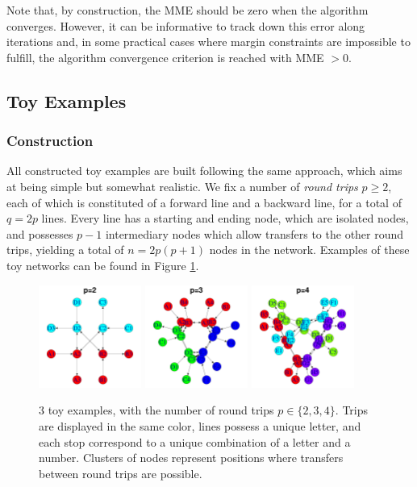 \documentclass{bmcart}
\begin{document}
Note that, by construction, the MME should be zero when the algorithm converges. However, it can be informative to track down this error along iterations and, in some practical cases where margin constraints are impossible to fulfill, the algorithm convergence criterion is reached with MME $> 0$.

\subsection{Toy Examples}
\label{toy_examples}

\subsubsection{Construction}
\label{example_construction}

All constructed toy examples are built following the same approach, which aims at being simple but somewhat realistic. We fix a number of \emph{round trips} $p \geq 2$, each of which is constituted of a forward line and a backward line, for a total of $q = 2p$ lines. Every line has a starting and ending node, which are isolated nodes, and possesses $p-1$ intermediary nodes which allow transfers to the other round trips, yielding a total of $n = 2p(p + 1)$ nodes in the network. Examples of these toy networks can be found in Figure \ref{toy_example_plots}.

\begin{figure}[h]
	\includegraphics[width=0.3\textwidth]{fig/toy_2_display.pdf}
	\includegraphics[width=0.3\textwidth]{fig/toy_3_display.pdf}
	\includegraphics[width=0.3\textwidth]{fig/toy_4_display.pdf}
	\caption{3 toy examples, with the number of round trips $p \in \{2,3,4\}$. Trips are displayed in the same color, lines possess a unique letter, and each stop correspond to a unique combination of a letter and a number. Clusters of nodes represent positions where transfers between round trips are possible.}
	\label{toy_example_plots}
\end{figure}
\end{document}
